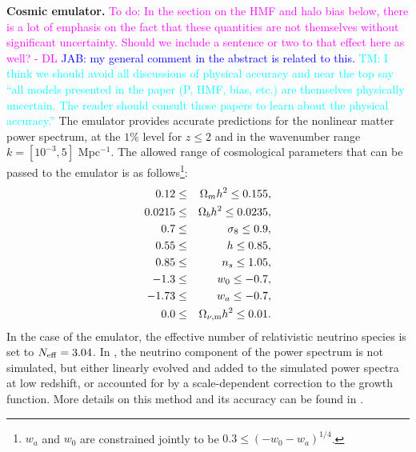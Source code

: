 \documentclass[\docopts]{\docclass}
\newcommand{\todo}[1]{\textcolor{magenta}{To do: #1}}
\newcommand{\jab}[1]{\textcolor{blue}{JAB: #1}}
\newcommand{\tom}[1]{\textcolor{cyan}{TM: #1}}
\begin{document}
{\bf Cosmic emulator.} \todo{In the section on the HMF and halo bias below, there is a lot of emphasis on the fact that these quantities are not themselves without significant uncertainty. Should we include a sentence or two to that effect here as well? - DL} \jab{my general comment in the abstract is related to this.} \tom{I think we should avoid all discussions of physical accuracy and near the top say ``all models presented in the paper (P, HMF, bias, etc.) are themselves physically uncertain. The reader should consult those papers to learn about the physical accuracy.''} The emulator \citep{Lawrence17} provides accurate predictions for the nonlinear matter power spectrum, at the $1\%$ level for $z\leq 2$ and in the wavenumber range $k=[10^{-3},5]$ Mpc$^{-1}$. The allowed range of cosmological parameters that can be passed to the emulator is as follows\footnote{$w_a$ and $w_0$ are constrained jointly to be $0.3\leq (-w_0-w_a)^{1/4}$.}:
 \begin{eqnarray}
 0.12&\leq& \Omega_{m} h^2 \leq 0.155,\nonumber\\
 0.0215&\leq& \Omega_{b} h^2 \leq 0.0235,\nonumber\\
 0.7&\leq& \sigma_8 \leq 0.9,\nonumber\\
 0.55&\leq& h \leq 0.85,\nonumber\\
 0.85&\leq& n_s\leq 1.05,\nonumber\\
 -1.3&\leq& w_0\leq-0.7,\nonumber\\
 -1.73&\leq& w_a\leq -0.7,\nonumber\\
 0.0&\leq& \Omega_{\nu, {\rm m}} h^2 \leq 0.01.
 \end{eqnarray}
In the case of the emulator, the effective number of relativistic neutrino species is set to $N_{\rm eff}=3.04$. In \citet{Lawrence17}, the neutrino component of the power spectrum is not simulated, but either linearly evolved and added to the simulated power spectra at low redshift, or accounted for by a scale-dependent correction to the growth function. More details on this method and its accuracy can be found in \citet{Upadhye14,Castorina15,Heitmann16}.
 
\end{document}
